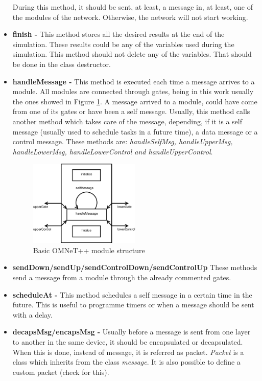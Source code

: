 \begin{itemize}
During this method, it should be sent, at least, a message in, at least, one of the modules of the network. Otherwise, the network will not start working.
 \item \textbf{finish - }This method stores all the desired results at the end of the simulation. These results could be any of the variables used during the 
simulation. This method should not delete any of the variables. That should be done in the class destructor.
 \item \textbf{handleMessage - }This method is executed each time a message arrives to a module. All modules are connected through gates,
being in this work usually the ones showed in Figure \ref{fig:omnetmodule}. A message arrived to a module, could have come from one of its gates or have been a self
message. Usually, this method calls another method which takes care of the message, depending, if it is a self message (usually used to schedule 
tasks in a future time), a data message or a control message. These methods are: \textit{handleSelfMsg, handleUpperMsg, handleLowerMsg, 
handleLowerControl and handleUpperControl}.
\begin{figure}[ht]
 \begin{center}
  \includegraphics[width=0.5\textwidth]{omnetmodule.eps}
 \end{center}
 \caption{Basic \ac{OMNeT++} module structure}
 \label{fig:omnetmodule}
\end{figure}
 \item \textbf{sendDown/sendUp/sendControlDown/sendControlUp }These methods send a message from a module through the already commented gates.
 \item \textbf{scheduleAt - }This method schedules a self message in a certain time in the future. This is useful to programme timers or when a
message should be sent with a delay.
 \item \textbf{decapsMsg/encapsMsg - }Usually before a message is sent from one layer to another in the same device, it should be encapsulated or 
decapsulated. When this is done, instead of message, it is referred as packet. \textit{Packet} is a class which inherits from the class \textit{message}. It 
is also possible to define a custom packet (check \cite{manualomnet} for this).
\end{itemize}

